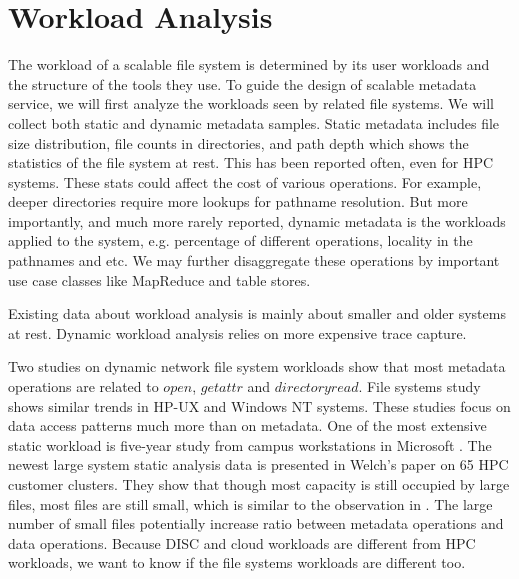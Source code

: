 \section{Workload Analysis}

The workload of a scalable file system is determined
by its user workloads and the structure of the tools they use.
To guide the design of scalable metadata service,
we will first analyze the workloads seen by related file systems.
We will collect both static and dynamic metadata samples.
Static metadata includes file size distribution,
file counts in directories, and path depth which shows the statistics of the file system at rest.
This has been reported often, even for HPC systems\cite{dayal2008storage, welch13}.
These stats could affect the cost of various operations.
For example, deeper directories require more lookups for pathname resolution.
But more importantly, and  much more rarely reported,
dynamic metadata is the workloads applied to the system,
e.g. percentage of different operations, locality in the pathnames and etc.
We may further disaggregate these operations by important use case classes like MapReduce and table stores.

Existing data about workload analysis is mainly about smaller and older systems at rest. 
Dynamic workload analysis relies on more expensive trace capture. 


Two studies on dynamic network file system workloads \cite{leung2008measurement,anderson2009capture}
show that most metadata operations are related to $open$, $getattr$ and $directory read$.
File systems study shows similar trends in HP-UX and Windows NT systems\cite{roselli2000comparison}.
These studies  focus on data access patterns much more than on metadata.
One of the most extensive static workload is
five-year study from campus workstations in Microsoft \cite{agrawal2007five}.
The newest large system static analysis data is presented in Welch's paper \cite{welch13} 
on  65 HPC customer  clusters. 
They show that though most capacity is still occupied by large files,
most files are still small,  which is similar to the observation in \cite{dayal2008storage}.
The large number of small files potentially increase
ratio between metadata operations and data operations.
Because DISC and cloud workloads are different from HPC workloads,  we want to know if the file systems workloads are different too.


